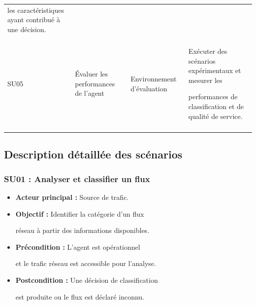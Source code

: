 \begin{table}[H]
\begin{tabularx}{\textwidth}{|p{1.4cm}|p{4cm}|p{3.2cm}|Y|}
les caractéristiques ayant contribué à une décision. \\\\

\hline



SU05 & Évaluer les performances de l'agent &

Environnement d'évaluation &

Exécuter des scénarios expérimentaux et mesurer les

performances de classification et de qualité de service. \\\\

\hline



\end{tabularx}

\end{table}





\subsection{Description détaillée des scénarios}



\subsubsection{SU01 : Analyser et classifier un flux}



\begin{itemize}

    \item \textbf{Acteur principal :} Source de trafic.

    \item \textbf{Objectif :} Identifier la catégorie d'un flux

    réseau à partir des informations disponibles.

    \item \textbf{Précondition :} L'agent est opérationnel

    et le trafic réseau est accessible pour l'analyse.

    \item \textbf{Postcondition :} Une décision de classification

    est produite ou le flux est déclaré inconnu.

\end{itemize}



